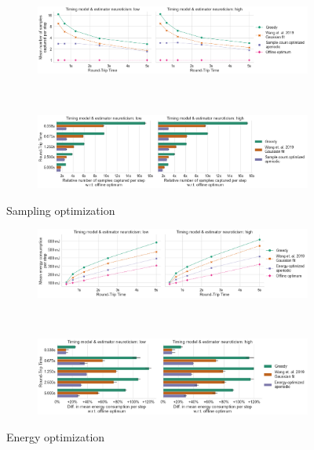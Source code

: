 \begin{figure}
    \centering
    \begin{subfigure}[t]{\textwidth}
        \centering
        \includegraphics[width=\textwidth]{figs/new_model/sampling_optimization.png}
        \caption{}
    \end{subfigure}\\
    \medskip
    \begin{subfigure}[t]{\textwidth}
        \centering
        \includegraphics[width=\textwidth]{figs/new_model/sampling_optimization_diff.png}
        \caption{}
    \end{subfigure}
    \caption{Sampling optimization}
\end{figure}

\begin{figure}
    \centering
    \begin{subfigure}[t]{\textwidth}
        \centering
        \includegraphics[width=\textwidth]{figs/new_model/energy_optimization.png}
        \caption{}
    \end{subfigure}\\
    \medskip
    \begin{subfigure}[t]{\textwidth}
        \centering
        \includegraphics[width=\textwidth]{figs/new_model/energy_optimization_diff.png}
        \caption{}
    \end{subfigure}
    \caption{Energy optimization}
\end{figure}